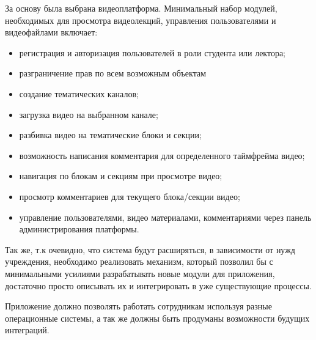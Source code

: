 За основу была выбрана видеоплатформа. Минимальный набор модулей, необходимых
для просмотра видеолекций, управления пользователями и видеофайлами включает:

\begin{itemize}[wide,topsep=0pt]
  \itemsep0em
  \item регистрация и авторизация пользователей в роли студента или лектора;
  \item разграничение прав по всем возможным объектам
  \item создание тематических каналов;
  \item загрузка видео на выбранном канале;
  \item разбивка видео на тематические блоки и секции;
  \item возможность написания комментария для определенного таймфрейма видео;
  \item навигация по блокам и секциям при просмотре видео;
  \item просмотр комментариев для текущего блока/секции видео;
  \item управление пользователями, видео материалами, комментариями через панель администрирования платформы.
\end{itemize}

Так же, т.к очевидно, что система будут расширяться, в зависимости от нужд учреждения,
необходимо реализовать механизм, который позволил бы с минимальными усилиями разрабатывать
новые модули для приложения, достаточно просто описывать их и интегрировать
в уже существующие процессы.

Приложение должно позволять работать сотрудникам используя разные операционные системы,
а так же должны быть продуманы возможности будущих интеграций.
